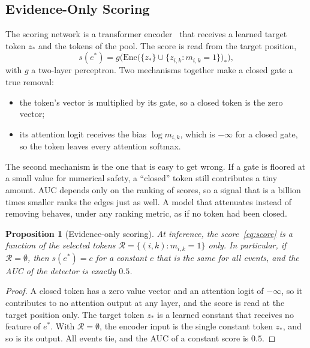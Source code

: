 \documentclass[pdflatex,sn-basic]{sn-jnl}
\newcommand{\Rcal}{\mathcal{R}}
\theoremstyle{definition}
\theoremstyle{plain}
\newtheorem{proposition}{Proposition}
\begin{document}
\subsection{Evidence-Only Scoring}
\label{sec:scoring}
The scoring network is a transformer encoder~\cite{vaswani2017} that receives
a learned target token $z_\ast$ and the tokens of the pool. The score is read
from the target position,
\begin{equation}
s(e^\ast)=g\Big(\mathrm{Enc}\big(\{z_\ast\}\cup\{z_{i,k}:m_{i,k}=1\}\big)_{\ast}\Big),
\label{eq:score}
\end{equation}
with $g$ a two-layer perceptron. Two mechanisms together make a closed gate a
true removal:
\begin{itemize}
\item the token's vector is multiplied by its gate, so a closed token is the
zero vector;
\item its attention logit receives the bias $\log m_{i,k}$, which is $-\infty$
for a closed gate, so the token leaves every attention softmax.
\end{itemize}
The second mechanism is the one that is easy to get wrong. If a gate is floored
at a small value for numerical safety, a ``closed'' token still contributes a
tiny amount. AUC depends only on the ranking of scores, so a signal that is a
billion times smaller ranks the edges just as well. A model that attenuates
instead of removing behaves, under any ranking metric, as if no token had been
closed.

\begin{proposition}[Evidence-only scoring]
\label{prop:integrity}
At inference, the score~\eqref{eq:score} is a function of the selected tokens
$\Rcal=\{(i,k):m_{i,k}=1\}$ only. In particular, if $\Rcal=\emptyset$, then
$s(e^\ast)=c$ for a constant $c$ that is the same for all events, and the AUC
of the detector is exactly $0.5$.
\end{proposition}

\begin{proof}
A closed token has a zero value vector and an attention logit of $-\infty$, so
it contributes to no attention output at any layer, and the score is read at
the target position only. The target token $z_\ast$ is a learned constant that
receives no feature of $e^\ast$. With $\Rcal=\emptyset$, the encoder input is
the single constant token $z_\ast$, and so is its output. All events tie, and
the AUC of a constant score is $0.5$.
\end{proof}
\end{document}
